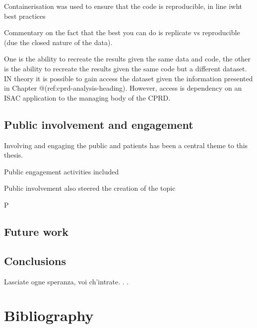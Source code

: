 \documentclass[a4paper, twoside]{templates/ociamthesis}
\begin{document}
Containerisation was used to ensure that the code is reproducible, in line iwht best practices

Commentary on the fact that the best you can do is replicate vs reproducible (due the closed nature of the data).

One is the ability to recreate the results given the same data and code, the other is the ability to recreate the results given the same code but a different dataset. IN theory it is possible to gain access the dataset given the information presented in Chapter @(ref:cprd-analysis-heading). However, access is dependency on an ISAC application to the managing body of the CPRD.

\hypertarget{disc-PPI}{%
\section{Public involvement and engagement}\label{disc-PPI}}

Involving and engaging the public and patients has been a central theme to this thesis.

Public engagement activities included

Public involvement also steered the creation of the topic

P

\hypertarget{future-work}{%
\section{Future work}\label{future-work}}

\hypertarget{conclusions-1}{%
\section{Conclusions}\label{conclusions-1}}

\begin{savequote}
Lasciate ogne speranza, voi ch'intrate. . .
\end{savequote}

\hypertarget{bibliography}{%
\chapter{Bibliography}\label{bibliography}}
\end{document}
